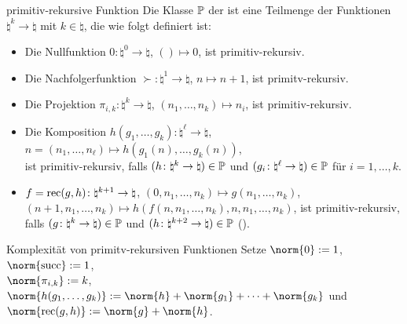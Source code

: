 \begin{Def}{primitiv-rekursive Funktion}
    Die Klasse $\mathbb{P}$ der  ist eine Teilmenge der Funktionen
    $\natural^k \rightarrow \natural$ mit $k \in \natural$, die wie folgt definiert ist:
    \begin{itemize}
        \item
        Die Nullfunktion
        $0\colon \natural^0 \rightarrow \natural$, $() \mapsto 0$, ist primitiv-rekursiv.
        
        \item
        Die Nachfolgerfunktion
        $\succ\colon \natural^1 \rightarrow \natural$, $n \mapsto n + 1$, ist primitv-rekursiv.
        
        \item
        Die Projektion
        $\pi_{i,k}\colon \natural^k \rightarrow \natural$, $(n_1, \dotsc, n_k) \mapsto n_i$,
        ist primitiv-rekursiv.
        
        \item
        Die Komposition
        $h(g_1, \dotsc, g_k)\colon \natural^\ell \rightarrow \natural$,
        $n = (n_1, \dotsc, n_\ell) \mapsto h(g_1(n), \dotsc, g_k(n))$,\\
        ist primitiv-rekursiv,
        falls $(h\colon \natural^k \rightarrow \natural) \in \mathbb{P}$ und
        $(g_i\colon \natural^\ell \rightarrow \natural) \in \mathbb{P}$ für $i = 1, \dotsc, k$.
        
        \item
        $f = \text{rec}(g, h)\colon \natural^{k+1} \rightarrow \natural$,
        $(0, n_1, \dotsc, n_k) \mapsto g(n_1, \dotsc, n_k)$,\\
        $(n + 1, n_1, \dotsc, n_k) \mapsto h(f(n, n_1, \dotsc, n_k), n, n_1, \dotsc, n_k)$,
        ist primitiv-rekursiv,\\
        falls $(g\colon \natural^k \rightarrow \natural) \in \mathbb{P}$ und
        $(h\colon \natural^{k+2} \rightarrow \natural) \in \mathbb{P}$
        ().
    \end{itemize}
\end{Def}

\begin{Def}{Komplexität von primitv-rekursiven Funktionen}
    Setze $\norm{0} := 1$,
    $\norm{\succ} := 1$,\\
    $\norm{\pi_{i,k}} := k$,
    $\norm{h(g_1, \dotsc, g_k)} := \norm{h} + \norm{g_1} + \dotsb + \norm{g_k}$ und
    $\norm{\rec(g, h)} := \norm{g} + \norm{h}$.
\end{Def}

